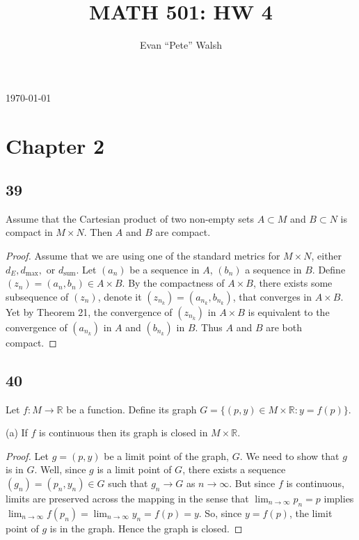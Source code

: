 \documentclass[11pt]{amsart}
\begin{document}
\title{MATH 501: HW 4}
\author{Evan ``Pete'' Walsh}
\today
\maketitle

\section*{Chapter 2}


\subsection*{39} Assume that the Cartesian product of two non-empty sets $A\subset M$ and $B\subset N$ is compact in $M\times N$. Then $A$ and $B$ are compact. 

\begin{proof}
  Assume that we are using one of the standard metrics for $M\times N$, either $d_{E}, d_{\text{max}},$ or $d_{\text{sum}}$. Let $(a_{n})$ be a sequence in $A$, $(b_{n})$ a sequence in $B$. Define $(z_{n}) = (a_{n}, b_{n}) \in A\times B$. By the compactness of $A\times B$, there exists some subsequence of $(z_{n})$, denote it $(z_{n_{k}}) = (a_{n_{k}}, b_{n_{k}})$, that converges in $A\times B$. Yet by Theorem 21, the convergence of $(z_{n_{k}})$ in $A\times B$ is equivalent to the convergence of $(a_{n_{k}})$ in $A$ and $(b_{n_{k}})$ in $B$. Thus $A$ and $B$ are both compact.
\end{proof}

\subsection*{40} Let $f: M\rightarrow \mathbb{R}$ be a function. Define its graph $G = \{(p,y)\in M\times \mathbb{R} : y = f(p)\}$.

(a) If $f$ is continuous then its graph is closed in $M\times \mathbb{R}$.

\begin{proof}
  Let $g = (p,y)$ be a limit point of the graph, $G$. We need to show that $g$ is in $G$. Well, since $g$ is a limit point of $G$, there exists a sequence $(g_{n}) = (p_{n}, y_{n}) \in G$ such that $g_{n}\rightarrow G$ as $n\rightarrow \infty$. But since $f$ is continuous, limits are preserved across the mapping in the sense that $\lim_{n\rightarrow\infty}p_{n} = p$ implies $\lim_{n\rightarrow\infty}f(p_{n}) = \lim_{n\rightarrow\infty}y_{n} = f(p) = y$. So, since $y = f(p)$, the limit point of $g$ is in the graph. Hence the graph is closed.
\end{proof}
\end{document}
